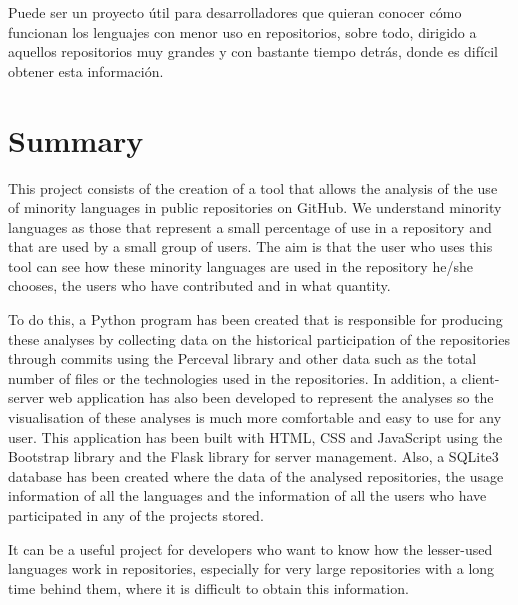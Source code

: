 \documentclass[a4paper, 12pt]{book}
\begin{document}
Puede ser un proyecto útil para desarrolladores que quieran conocer cómo funcionan los lenguajes con menor uso en repositorios, sobre todo, dirigido a aquellos repositorios muy grandes y con bastante tiempo detrás, donde es difícil obtener esta información. 


\chapter*{Summary}

This project consists of the creation of a tool that allows the analysis of the use of minority languages in public repositories on GitHub. We understand minority languages as those that represent a small percentage of use in a repository and that are used by a small group of users. The aim is that the user who uses this tool can see how these minority languages are used in the repository he/she chooses, the users who have contributed and in what quantity.

To do this, a Python program has been created that is responsible for producing these analyses by collecting data on the historical participation of the repositories through commits using the Perceval library and other data such as the total number of files or the technologies used in the repositories. In addition, a client-server web application has also been developed to represent the analyses so the visualisation of these analyses is much more comfortable and easy to use for any user. This application has been built with HTML, CSS and JavaScript using the Bootstrap library and the Flask library for server management. Also, a SQLite3 database has been created where the data of the analysed repositories, the usage information of all the languages and the information of all the users who have participated in any of the projects stored.

It can be a useful project for developers who want to know how the lesser-used languages work in repositories, especially for very large repositories with a long time behind them, where it is difficult to obtain this information. 


\end{document}
